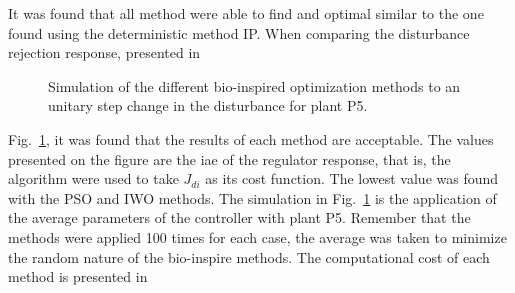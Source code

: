 It was found that all method were able to find and optimal similar to the one found using the deterministic method IP. When comparing the disturbance rejection response, presented in %
%
\begin{figure}[tb]%
	\centering
	\caption{Simulation of the different bio-inspired optimization methods to an unitary step change in the disturbance for plant P5.}%
	\label{fig:Disturbance}%
\end{figure}
%
Fig.~\ref{fig:Disturbance}, it was found that the results of each method are acceptable. The values presented on the figure are the \gls{iae} of the regulator response, that is, the algorithm were used to take $J_{di}$ as its cost function. The lowest value was found with the PSO and IWO methods. The simulation in Fig.~\ref{fig:Disturbance} is the application of the average parameters of the controller with plant P5. Remember that the methods were applied 100 times for each case, the average was taken to minimize the random nature of the bio-inspire methods. The computational cost of each method is presented in %
%
